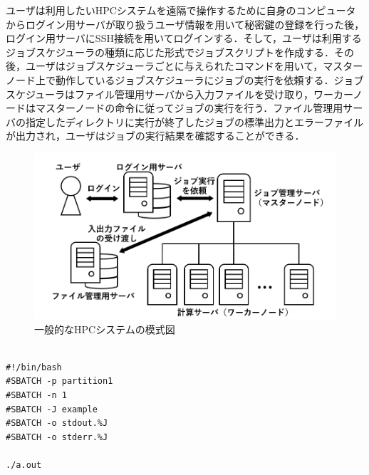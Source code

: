 ユーザは利用したいHPCシステムを遠隔で操作するために自身のコンピュータからログイン用サーバが取り扱うユーザ情報を用いて秘密鍵の登録を行った後，ログイン用サーバにSSH接続を用いてログインする．そして，ユーザは利用するジョブスケジューラの種類に応じた形式でジョブスクリプトを作成する．その後，ユーザはジョブスケジューラごとに与えられたコマンドを用いて，マスターノード上で動作しているジョブスケジューラにジョブの実行を依頼する．ジョブスケジューラはファイル管理用サーバから入力ファイルを受け取り，ワーカーノードはマスターノードの命令に従ってジョブの実行を行う．ファイル管理用サーバの指定したディレクトリに実行が終了したジョブの標準出力とエラーファイルが出力され，ユーザはジョブの実行結果を確認することができる．\par

\begin{figure}[tb]
    \centering
    \includegraphics[width=120mm]{./fig/HPCsystem.png}
    \caption{一般的なHPCシステムの模式図}
    \label{fig4}
\end{figure}

\begin{lstlisting}[caption=Slurmのジョブスクリプトファイル作成例, label=job_script]

#!/bin/bash
#SBATCH -p partition1
#SBATCH -n 1
#SBATCH -J example
#SBATCH -o stdout.%J
#SBATCH -o stderr.%J
    
./a.out
    
\end{lstlisting}

